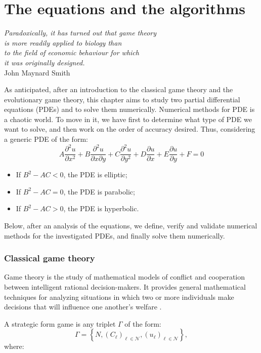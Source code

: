 
\part{The equations and the algorithms}
\noindent \begin{flushright}
\textit{Paradoxically, it has turned out that game theory}\\
\textit{ is more readily applied to biology than }\\
\textit{to the field of economic behaviour for which }\\
\textit{it was originally designed.}\\
\textit{ }John Maynard Smith 
\par\end{flushright}

As anticipated, after an introduction to the classical game theory
and the evolutionary game theory, this chapter aims to study two partial
differential equations (PDEs) and to solve them numerically. Numerical
methods for PDE is a chaotic world. To move in it, we have first to
determine what type of PDE we want to solve, and then work on the
order of accuracy desired. Thus, considering a generic PDE of the
form:
\[
A\frac{\partial^{2}u}{\partial x^{2}}+B\frac{\partial^{2}u}{\partial x\partial y}+C\frac{\partial^{2}u}{\partial y^{2}}+D\frac{\partial u}{\partial x}+E\frac{\partial u}{\partial y}+F=0
\]

\begin{itemize}
\item If $B^{2}-AC<0$, the PDE is elliptic;
\item If $B^{2}-AC=0$, the PDE is parabolic;
\item If $B^{2}-AC>0$, the PDE is hyperbolic.
\end{itemize}
Below, after an analysis of the equations, we define, verify and validate
numerical methods for the investigated PDEs, and finally solve them
numerically.

\section{Classical game theory}

Game theory is the study of mathematical models of conflict and cooperation
between intelligent rational decision-makers. It provides general
mathematical techniques for analyzing situations in which two or more
individuals make decisions that will influence one another's welfare
\cite{myerson1991game}.
\begin{defn}
A strategic form game is any triplet $\Gamma$ of the form:
\[
\Gamma=\left\{ N,\left(C_{\ell}\right)_{\ell\in\mathcal{N}},\left(u_{\ell}\right)_{\ell\in\mathcal{N}}\right\} ,
\]
 where:
\end{defn}

